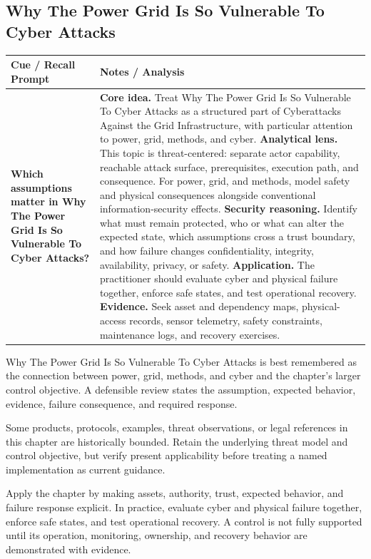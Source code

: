 \documentclass[11pt]{article}
\newcommand{\CornellHeader}{%
\rowcolor{Navy}\color{white}\bfseries Cue / Recall Prompt & \color{white}\bfseries Notes / Analysis\\\hline}
\newcommand{\CornellRow}[2]{%
\cellcolor{CueGray}\RaggedRight\textbf{#1} & \RaggedRight #2\\\hline}
\begin{document}
\subsection*{Why The Power Grid Is So Vulnerable To Cyber Attacks}
\begin{longtable}{>{\RaggedRight\arraybackslash}p{}|>{\RaggedRight\arraybackslash}p{}}
\CornellHeader
\CornellRow{Which assumptions matter in Why The Power Grid Is So Vulnerable To Cyber Attacks?}{\textbf{Core idea.} Treat Why The Power Grid Is So Vulnerable To Cyber Attacks as a structured part of Cyberattacks Against the Grid Infrastructure, with particular attention to power, grid, methods, and cyber. \textbf{Analytical lens.} This topic is threat-centered: separate actor capability, reachable attack surface, prerequisites, execution path, and consequence. For power, grid, and methods, model safety and physical consequences alongside conventional information-security effects. \textbf{Security reasoning.} Identify what must remain protected, who or what can alter the expected state, which assumptions cross a trust boundary, and how failure changes confidentiality, integrity, availability, privacy, or safety. \textbf{Application.} The practitioner should evaluate cyber and physical failure together, enforce safe states, and test operational recovery. \textbf{Evidence.} Seek asset and dependency maps, physical-access records, sensor telemetry, safety constraints, maintenance logs, and recovery exercises.}
\end{longtable}
\begin{topicsummary}
Why The Power Grid Is So Vulnerable To Cyber Attacks is best remembered as the connection between power, grid, methods, and cyber and the chapter's larger control objective. A defensible review states the assumption, expected behavior, evidence, failure consequence, and required response.
\end{topicsummary}
\begin{historybox}
Some products, protocols, examples, threat observations, or legal references in this chapter are historically bounded. Retain the underlying threat model and control objective, but verify present applicability before treating a named implementation as current guidance.
\end{historybox}
\begin{defensebox}
Apply the chapter by making assets, authority, trust, expected behavior, and failure response explicit. In practice, evaluate cyber and physical failure together, enforce safe states, and test operational recovery. A control is not fully supported until its operation, monitoring, ownership, and recovery behavior are demonstrated with evidence.
\end{defensebox}
\end{document}

